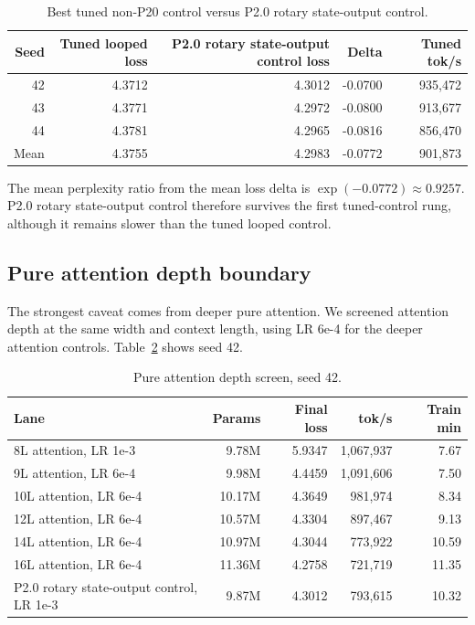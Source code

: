 \documentclass[11pt]{article}
\newcommand{\pshort}{P20}
\newcommand{\pcontrol}{P2.0 rotary state-output control}
\begin{document}
\begin{table}[h]
\centering
\caption{Best tuned non-\pshort{} control versus \pcontrol{}.}
\label{tab:tuned}
\begin{tabular}{rrrrr}
\toprule
Seed & Tuned looped loss & \pcontrol{} loss & Delta & Tuned tok/s \\
\midrule
42 & 4.3712 & 4.3012 & -0.0700 & 935,472 \\
43 & 4.3771 & 4.2972 & -0.0800 & 913,677 \\
44 & 4.3781 & 4.2965 & -0.0816 & 856,470 \\
\midrule
Mean & 4.3755 & 4.2983 & -0.0772 & 901,873 \\
\bottomrule
\end{tabular}
\end{table}

The mean perplexity ratio from the mean loss delta is
$\exp(-0.0772) \approx 0.9257$. \pcontrol{} therefore survives the first
tuned-control rung, although it remains slower than the tuned looped control.

\subsection{Pure attention depth boundary}

The strongest caveat comes from deeper pure attention. We screened attention
depth at the same width and context length, using LR 6e-4 for the deeper
attention controls. Table~\ref{tab:depth} shows seed 42.

\begin{table}[h]
\centering
\caption{Pure attention depth screen, seed 42.}
\label{tab:depth}
\begin{tabular}{lrrrr}
\toprule
Lane & Params & Final loss & tok/s & Train min \\
\midrule
8L attention, LR 1e-3 & 9.78M & 5.9347 & 1,067,937 & 7.67 \\
9L attention, LR 6e-4 & 9.98M & 4.4459 & 1,091,606 & 7.50 \\
10L attention, LR 6e-4 & 10.17M & 4.3649 & 981,974 & 8.34 \\
12L attention, LR 6e-4 & 10.57M & 4.3304 & 897,467 & 9.13 \\
14L attention, LR 6e-4 & 10.97M & 4.3044 & 773,922 & 10.59 \\
16L attention, LR 6e-4 & 11.36M & 4.2758 & 721,719 & 11.35 \\
\pcontrol{}, LR 1e-3 & 9.87M & 4.3012 & 793,615 & 10.32 \\
\bottomrule
\end{tabular}
\end{table}
\end{document}
